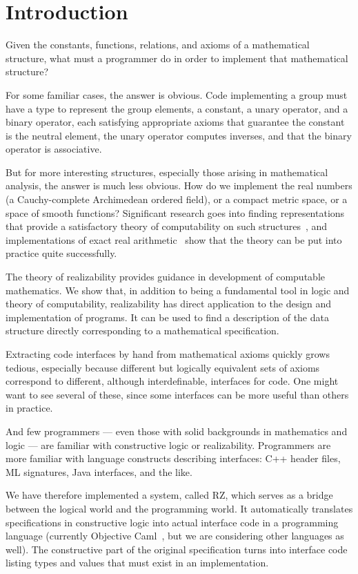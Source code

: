 \section{Introduction}
\label{sec:introduction}

Given the constants, functions, relations, and axioms of a
mathematical structure, what must a programmer do in order to
implement that mathematical structure?

For some familiar cases, the answer is obvious. Code implementing a
group must have a type to represent the group elements, a constant, a
unary operator, and a binary operator, each satisfying appropriate
axioms that guarantee the constant is the neutral element, the unary
operator computes inverses, and that the binary operator is
associative.

But for more interesting structures, especially those arising in
mathematical analysis, the answer is much less obvious. How do we
implement the real numbers (a Cauchy-complete Archimedean ordered
field), or a compact metric space, or a space of smooth functions?
Significant research goes into finding representations that provide a
satisfactory theory of computability on such
structures~\cite{Wei00,TZ98,Bla97,EL00}, and implementations of exact
real arithmetic~\cite{Mue00,Lam05a} show that the theory can be put
into practice quite successfully.

The theory of realizability provides guidance in development of
computable mathematics. We show that, in addition to being a
fundamental tool in logic and theory of computability, realizability
has direct application to the design and implementation of programs.
It can be used to find a description of the data structure directly
corresponding to a mathematical specification.

Extracting code interfaces by hand from mathematical axioms quickly
grows tedious, especially because different but logically equivalent
sets of axioms correspond to different, although interdefinable,
interfaces for code. One might want to see several of these, since
some interfaces can be more useful than others in practice.

And few programmers --- even those with solid backgrounds in
mathematics and logic --- are familiar with constructive logic or
realizability. Programmers are more familiar with language constructs
describing interfaces: C++ header files, ML signatures, Java
interfaces, and the like.

\bigskip

We have therefore implemented a system, called RZ, which serves as a
bridge between the logical world and the programming world. It
automatically translates specifications in constructive logic into
actual interface code in a programming language (currently Objective
Caml~\cite{ocaml}, but we are considering other languages as well). The
constructive part of the original specification turns into interface
code listing types and values that must exist in an implementation.

